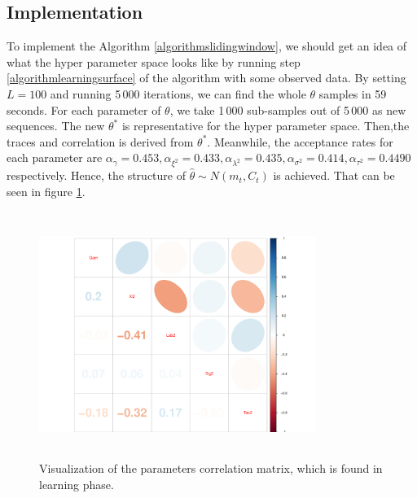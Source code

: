 \subsection{Implementation}

To implement the Algorithm \ref{algorithmslidingwindow}, we should get an idea of what the hyper parameter space looks like by running step \ref{algorithmlearningsurface} of the algorithm with some observed data. By setting $L=100$ and running 5\,000 iterations, we can find the whole $\theta$ samples in 59 seconds. For each parameter of $\theta$, we take 1\,000 sub-samples out of 5\,000 as new sequences. The new $\theta^*$ is representative for the hyper parameter space. Then,the traces and correlation is derived from $\theta^*$. Meanwhile, the acceptance rates for each parameter are $\alpha_\gamma = 0.453,\alpha_{\xi^2}=0.433, \alpha_{\lambda^2}=0.435, \alpha_{\sigma^2}=0.414, \alpha_{\tau^2}=0.4490$ respectively. Hence, the structure of  $\hat{\theta}\sim N\left( m_t,C_t\right)$ is achieved. That can be seen in figure \ref{realdatacorMatrix}. 
\begin{figure}[h]
\centering
\includegraphics[width=0.8\textwidth,height=8cm]{Chapters/05MCMCOU/plots/realdatalearningcorMatrix.pdf}
\caption{Visualization of the parameters correlation matrix, which is found in learning phase. }\label{realdatacorMatrix}
\end{figure}


